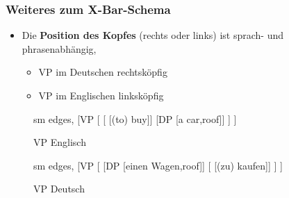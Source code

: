 \begin{frame}
\frametitle{Weiteres zum X-Bar-Schema}

	\begin{itemize}
		\item Die \textbf{Position des Kopfes} (rechts oder links) ist sprach- und phrasenabhängig,
		\begin{itemize}
			\item VP im Deutschen \ras rechtsköpfig
			\item VP im Englischen \ras linksköpfig			
		\end{itemize}
	\end{itemize}
	
\begin{figure}[b]
  	\begin{minipage}[b]{0.45\textwidth}
	\centering
	\footnotesize{
		\begin{forest}
		sm edges,
		[VP	[
					[\alert{} [(to) buy]]
					[DP [a car,roof]]
			]
		]
		\end{forest}
		}
		\caption{VP Englisch}
  	\end{minipage}  
	\begin{minipage}[b]{0.45\textwidth}
	\centering
	\footnotesize{
		\begin{forest}
		sm edges,
		[VP	[\MyPxbar{V}
					[DP [einen Wagen,roof]]
					[\alert{} [(zu) kaufen]]					
			]
		]
		\end{forest}
		}
		\caption{VP Deutsch}
  	\end{minipage}  
\end{figure}

\end{frame}


